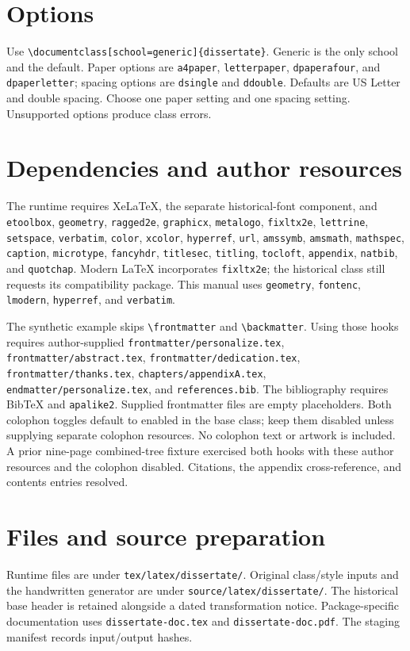 \documentclass[10pt,letterpaper]{article}
\begin{document}
\section*{Options}
Use \verb|\documentclass[school=generic]{dissertate}|. Generic is the only school
and the default. Paper options are \texttt{a4paper}, \texttt{letterpaper},
\texttt{dpaperafour}, and \texttt{dpaperletter}; spacing options are
\texttt{dsingle} and \texttt{ddouble}. Defaults are US Letter and double spacing.
Choose one paper setting and one spacing setting. Unsupported options produce
class errors.
\newpage
\section*{Dependencies and author resources}
\begingroup\raggedright
The runtime requires XeLaTeX, the separate historical-font component, and
\texttt{etoolbox}, \texttt{geometry}, \texttt{ragged2e}, \texttt{graphicx}, \texttt{metalogo},
\texttt{fixltx2e}, \texttt{lettrine}, \texttt{setspace}, \texttt{verbatim},
\texttt{color}, \texttt{xcolor}, \texttt{hyperref}, \texttt{url},
\texttt{amssymb}, \texttt{amsmath}, \texttt{mathspec}, \texttt{caption},
\texttt{microtype}, \texttt{fancyhdr}, \texttt{titlesec}, \texttt{titling},
\texttt{tocloft}, \texttt{appendix}, \texttt{natbib}, and \texttt{quotchap}.
Modern LaTeX incorporates \texttt{fixltx2e}; the historical class still requests
its compatibility package. This manual uses \texttt{geometry}, \texttt{fontenc},
\texttt{lmodern}, \texttt{hyperref}, and \texttt{verbatim}.

The synthetic example skips \verb|\frontmatter| and \verb|\backmatter|. Using
those hooks requires author-supplied \texttt{frontmatter/personalize.tex},
\texttt{frontmatter/abstract.tex}, \texttt{frontmatter/dedication.tex},
\texttt{frontmatter/thanks.tex}, \texttt{chapters/appendixA.tex},
\texttt{endmatter/personalize.tex}, and \texttt{references.bib}. The bibliography
requires BibTeX and \texttt{apalike2}. Supplied frontmatter files are empty
placeholders. Both colophon toggles default to enabled in the base class; keep
them disabled unless supplying separate colophon resources. No colophon text or
artwork is included. A prior nine-page combined-tree fixture exercised both hooks
with these author resources and the colophon disabled. Citations, the appendix
cross-reference, and contents entries resolved.
\par\endgroup
\section*{Files and source preparation}
Runtime files are under \texttt{tex/latex/dissertate/}. Original class/style
inputs and the handwritten generator are under \texttt{source/latex/dissertate/}.
The historical base header is retained alongside a dated transformation notice.
Package-specific documentation uses \texttt{dissertate-doc.tex} and
\texttt{dissertate-doc.pdf}. The staging manifest records input/output hashes.
\end{document}
